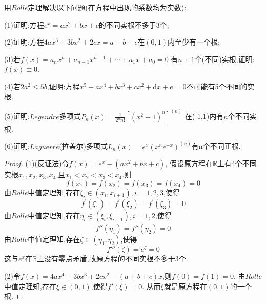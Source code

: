 \documentclass[lang=cn,newtx,10pt,scheme=chinese]{../Template/elegantbook}
\begin{document}
\begin{exercise}\label{(ex:2.2)}
    用$Rolle$定理解决以下问题(在方程中出现的系数均为实数):

(1)证明:方程$e^x=ax^2+bx+c$的不同实根不多于3个;

(2)证明:方程$4ax^3+3bx^2+2cx=a+b+c$在$(0,1)$内至少有一个根;

(3)若$f\left( x \right) =a_nx^n+a_{n-1}x^{n-1}+\cdots +a_1x+a_0=0$
有$n+1$个(不同)实根,证明:$f(x)\equiv 0$.

(4)若$2a^2\leqslant 5b$,证明:方程$x^5+ax^4+bx^3+cx^2+\mathrm{d}x+e=0$不可能有5个不同的实根.

(5)证明:$Legendre$多项式$P_n\left( x \right) =\frac{1}{2^nn!}\left[ \left( x^2-1 \right) ^n \right] ^{\left( n \right)}$
在(-1,1)内有$n$个不同实根.

(6)证明:$Laguerre$(拉盖尔)多项式$L_n\left( x \right) =e^x\left( x^ne^{-x} \right) ^{\left( n \right)}$有n个不同正根.

\begin{proof}
    (1)(反证法)令$f(x)=e^x-(ax^2+bx+c)$,
    假设原方程在$\mathbb{R}$上有4个不同实根$x_1,x_2,x_3,x_4$,且$x_1<x_2<x_3<x_4$.则
    \begin{equation}
        f(x_1)=f(x_2)=f(x_3)=f(x_4)=0
        \nonumber
    \end{equation}
    由$Rolle$中值定理知,存在$\xi_i\in(x_i,x_{i+1}),i=1,2,3$,使得
    \begin{equation}
        f^{\prime}(\xi_1)=f^{\prime}(\xi_2)=f^{\prime}(\xi_3)=0
        \nonumber
    \end{equation}
    由$Rolle$中值定理知,存在$\eta_i\in(\xi_i,\xi_{i+1}),i=1,2$,使得
    \begin{equation}
        f''(\eta_1)=f''(\eta_2)=0
        \nonumber
    \end{equation}
    由$Rolle$中值定理知,存在$\zeta\in(\eta_1,\eta_2)$,使得
    \begin{equation}
        f'''(\zeta)=e^\zeta=0
        \nonumber
    \end{equation}
    这与$e^x$在$\mathbb{R}$上没有零点矛盾,故原方程的不同实根不多于3个.

    (2)令$f(x)=4ax^4+3bx^3+2cx^2-(a+b+c)x$,则$f(0)=f(1)=0$.
    由$Rolle$中值定理知,存在$\xi\in(0,1)$,使得$f'(\xi)=0$.
    从而$\xi$就是原方程在$(0,1)$的一个根.


\end{proof}
\end{exercise}
\end{document}
